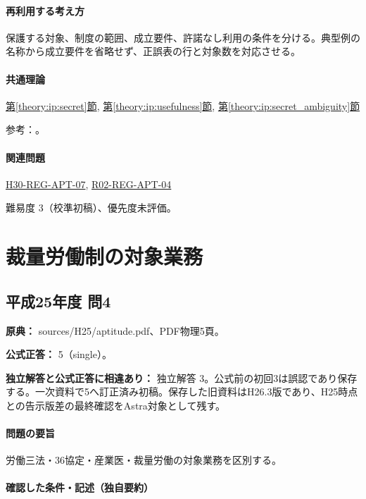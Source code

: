 \paragraph{再利用する考え方} 保護する対象、制度の範囲、成立要件、許諾なし利用の条件を分ける。典型例の名称から成立要件を省略せず、正誤表の行と対象数を対応させる。

\paragraph{共通理論} \hyperref[theory:ip:secret]{第\ref*{theory:ip:secret}節}, \hyperref[theory:ip:usefulness]{第\ref*{theory:ip:usefulness}節}, \hyperref[theory:ip:secret_ambiguity]{第\ref*{theory:ip:secret_ambiguity}節}

\par 参考：\cite{ip_unfair_statute,ip_secret_handbook2017}。

\paragraph{関連問題} \hyperref[q:h30-reg-apt-07]{H30-REG-APT-07}, \hyperref[q:r02-reg-apt-04]{R02-REG-APT-04}

\par 難易度 3（校準初稿）、優先度未評価。

\section{裁量労働制の対象業務}

\subsection{平成25年度 問4}
\label{q:h25-reg-apt-04}

\noindent\textbf{原典：} sources/H25/aptitude.pdf、PDF物理5頁。

\textbf{公式正答：} 5（single）。

\par\textbf{独立解答と公式正答に相違あり：} 独立解答 3。公式前の初回3は誤認であり保存する。一次資料で5へ訂正済み初稿。保存した旧資料はH26.3版であり、H25時点との告示版差の最終確認をAstra対象として残す。

\paragraph{問題の要旨} 労働三法・36協定・産業医・裁量労働の対象業務を区別する。

\paragraph{確認した条件・記述（独自要約）}\mbox{}\par

